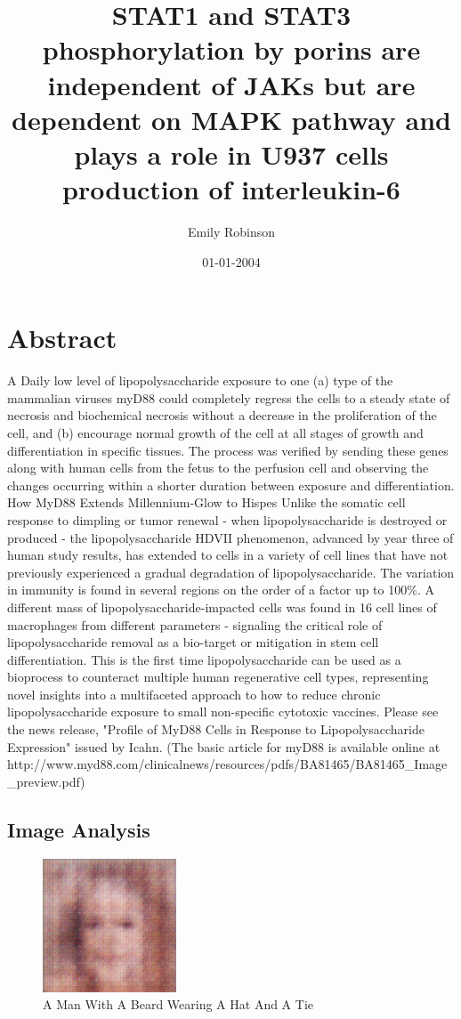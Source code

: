 \documentclass{article}%
\title{STAT1 and STAT3 phosphorylation by porins are independent of JAKs but are dependent on MAPK pathway and plays a role in U937 cells production of interleukin{-}6}%
\author{Emily Robinson}%
\affil{Program on Emerging Infectious Diseases, DUKE{-}NUS Graduate Medical School, Singapore}%
\date{01{-}01{-}2004}%
\begin{document}
%
\normalsize%
\maketitle%
\section{Abstract}%
\label{sec:Abstract}%
A Daily low level of lipopolysaccharide exposure to one (a) type of the mammalian viruses myD88 could completely regress the cells to a steady state of necrosis and biochemical necrosis without a decrease in the proliferation of the cell, and (b) encourage normal growth of the cell at all stages of growth and differentiation in specific tissues. The process was verified by sending these genes along with human cells from the fetus to the perfusion cell and observing the changes occurring within a shorter duration between exposure and differentiation.\newline%
How MyD88 Extends Millennium{-}Glow to Hispes\newline%
Unlike the somatic cell response to dimpling or tumor renewal {-} when lipopolysaccharide is destroyed or produced {-} the lipopolysaccharide HDVII phenomenon, advanced by year three of human study results, has extended to cells in a variety of cell lines that have not previously experienced a gradual degradation of lipopolysaccharide. The variation in immunity is found in several regions on the order of a factor up to 100\%. A different mass of lipopolysaccharide{-}impacted cells was found in 16 cell lines of macrophages from different parameters {-} signaling the critical role of lipopolysaccharide removal as a bio{-}target or mitigation in stem cell differentiation. This is the first time lipopolysaccharide can be used as a bioprocess to counteract multiple human regenerative cell types, representing novel insights into a multifaceted approach to how to reduce chronic lipopolysaccharide exposure to small non{-}specific cytotoxic vaccines.\newline%
Please see the news release, "Profile of MyD88 Cells in Response to Lipopolysaccharide Expression" issued by Icahn. (The basic article for myD88 is available online at http://www.myd88.com/clinicalnews/resources/pdfs/BA81465/BA81465\_Image\_preview.pdf)

%
\subsection{Image Analysis}%
\label{subsec:ImageAnalysis}%


\begin{figure}[h!]%
\centering%
\includegraphics[width=150px]{500_fake_images/samples_5_150.png}%
\caption{A Man With A Beard Wearing A Hat And A Tie}%
\end{figure}

%
\end{document}
